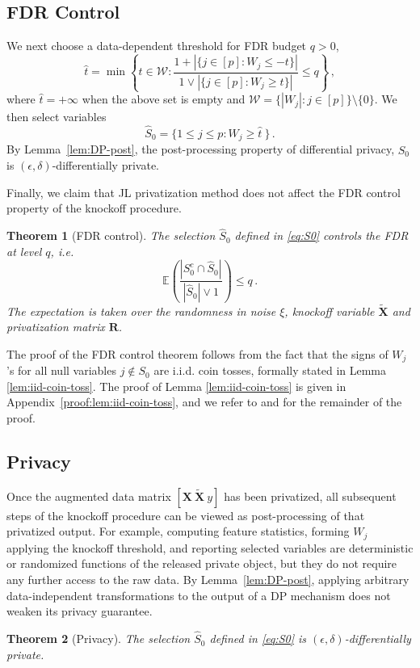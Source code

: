 \documentclass[11pt]{article}
\newtheorem{theorem}{Theorem}%
\newcommand{\bX}{\boldsymbol{X}}
\newcommand{\bXT}{\widetilde{\bX} }
\newcommand{\bR}{\boldsymbol{R}}
\newcommand{\Expected}{\mathbb{E}}
\newcommand{\hS}{\widehat{S}}
\newcommand{\wht}{\widehat{t}}
\begin{document}
\subsection{FDR Control}\label{sec:FDR-control}
We next choose a data-dependent threshold for FDR budget $q>0$,
\[
\wht = \min\left\{t\in\mathcal{W}: \frac{1+|\{j\in[p]:W_j\leq-t\}|}{1\vee|\{j\in[p]:W_j\geq t\}|}\leq q\right\}\,,
\]
where $\wht = +\infty$ when the above set is empty and $\mathcal{W}=\{|W_j|:j\in[p]\}\setminus{\{0\}}$. We then select variables 
\begin{equation}\label{eq:S0}
    \hS_0=\{1\leq j\leq p: W_j\geq \wht\ \}\,.
\end{equation}
By Lemma~\ref{lem:DP-post}, the post-processing property of differential privacy, $\hS_0$ is $(\epsilon,\delta)$-differentially private.

Finally, we claim that JL privatization method does not affect the FDR control property of the knockoff procedure. 
\begin{theorem}[FDR control]\label{thm:FDR}
    The selection $\hS_0$ defined in \eqref{eq:S0} controls the FDR at level $q$, i.e.
    \[
    \Expected\left(\frac{|S_0^c\cap\hS_0|}{|\hS_0|\vee 1}\right)\leq q\,.
    \]
    The expectation is taken over the randomness in noise $\xi$, knockoff variable $\bXT$ and privatization matrix $\bR$.
\end{theorem}
The proof of the FDR control theorem follows from the fact that the signs of $W_j$'s for all null variables $j\notin S_0$ are i.i.d. coin tosses, formally stated in Lemma \ref{lem:iid-coin-toss}. The proof of Lemma \ref{lem:iid-coin-toss} is given in Appendix~\ref{proof:lem:iid-coin-toss}, and we refer to \cite[Theorem 3.4]{candes2017panning} and \cite[Theorem 2]{Barber_2015} for the remainder of the proof.

\subsection{Privacy}
Once the augmented data matrix $[\bX \ \bXT \ y]$ has been privatized, all subsequent steps of the knockoff procedure can be viewed as post-processing of that privatized output. For example, computing feature statistics, forming $W_j$ applying the knockoff threshold, and reporting selected variables are deterministic or randomized functions of the released private object, but they do not require any further access to the raw data. By Lemma~\ref{lem:DP-post}, applying arbitrary data-independent transformations to the output of a DP mechanism does not weaken its privacy guarantee. 
\begin{theorem}[Privacy]\label{thm:privacy}
    The selection $\hS_0$ defined in \eqref{eq:S0} is $(\epsilon,\delta)$-differentially private.
\end{theorem}
\end{document}
